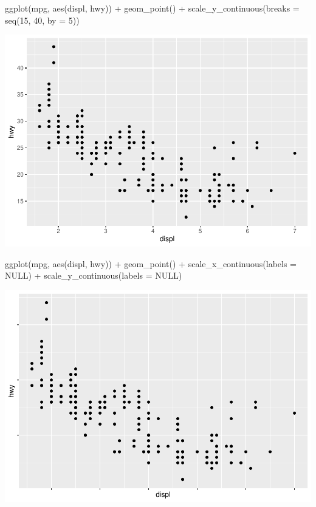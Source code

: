 \documentclass[
]{article}
\newenvironment{Shaded}{\begin{snugshade}}{\end{snugshade}}
\newcommand{\AttributeTok}[1]{\textcolor[rgb]{0.77,0.63,0.00}{#1}}
\newcommand{\ConstantTok}[1]{\textcolor[rgb]{0.00,0.00,0.00}{#1}}
\newcommand{\DecValTok}[1]{\textcolor[rgb]{0.00,0.00,0.81}{#1}}
\newcommand{\FunctionTok}[1]{\textcolor[rgb]{0.00,0.00,0.00}{#1}}
\newcommand{\NormalTok}[1]{#1}
\newcommand{\SpecialCharTok}[1]{\textcolor[rgb]{0.00,0.00,0.00}{#1}}
\begin{document}
\begin{Shaded}
\begin{Highlighting}[]
\FunctionTok{ggplot}\NormalTok{(mpg, }\FunctionTok{aes}\NormalTok{(displ, hwy)) }\SpecialCharTok{+}
  \FunctionTok{geom\_point}\NormalTok{() }\SpecialCharTok{+}
  \FunctionTok{scale\_y\_continuous}\NormalTok{(}\AttributeTok{breaks =} \FunctionTok{seq}\NormalTok{(}\DecValTok{15}\NormalTok{, }\DecValTok{40}\NormalTok{, }\AttributeTok{by =} \DecValTok{5}\NormalTok{))}
\end{Highlighting}
\end{Shaded}

\includegraphics{Journal_files/figure-latex/unnamed-chunk-54-3.pdf}

\begin{Shaded}
\begin{Highlighting}[]
\FunctionTok{ggplot}\NormalTok{(mpg, }\FunctionTok{aes}\NormalTok{(displ, hwy)) }\SpecialCharTok{+}
  \FunctionTok{geom\_point}\NormalTok{() }\SpecialCharTok{+}
  \FunctionTok{scale\_x\_continuous}\NormalTok{(}\AttributeTok{labels =} \ConstantTok{NULL}\NormalTok{) }\SpecialCharTok{+}
  \FunctionTok{scale\_y\_continuous}\NormalTok{(}\AttributeTok{labels =} \ConstantTok{NULL}\NormalTok{)}
\end{Highlighting}
\end{Shaded}

\includegraphics{Journal_files/figure-latex/unnamed-chunk-54-4.pdf}
\end{document}
